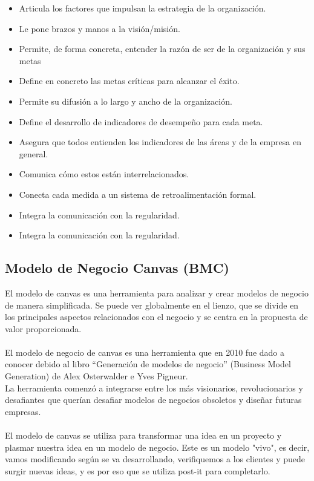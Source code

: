\documentclass[preprint,12pt]{elsarticle}
\begin{document}
	\begin{itemize}
	\item Articula los factores que impulsan la estrategia de la organización.
	\item Le pone brazos y manos a la visión/misión.

	\item Permite, de forma concreta, entender la razón de ser de la organización y sus metas
	\item Define en concreto las metas críticas para alcanzar el éxito.

	\item Permite su difusión a lo largo y ancho de la organización.
	\item Define el desarrollo de indicadores de desempeño para cada meta.

	\item Asegura que todos entienden los indicadores de las áreas y de la empresa en general.
	\item Comunica cómo estos están interrelacionados.

	\item Conecta cada medida a un sistema de retroalimentación formal.
	\item Integra la comunicación con la regularidad.

	\item Integra la comunicación con la regularidad.
	\end{itemize}


	\subsection{\textbf{Modelo de Negocio Canvas (BMC) }}

El modelo de canvas es una herramienta para analizar y crear modelos de negocio de manera simplificada. Se puede ver globalmente en el lienzo, que se divide en los principales aspectos relacionados con el negocio y se centra en la propuesta de valor proporcionada. \\\\
El modelo de negocio de canvas es una herramienta que en 2010 fue dado a conocer debido al libro “Generación de modelos de negocio” (Business Model Generation) de Alex Osterwalder e Yves Pigneur. \cite{referenciasosa4}\\
La herramienta comenzó a integrarse entre los más visionarios, revolucionarios y desafiantes que querían desafiar modelos de negocios obsoletos y diseñar futuras empresas.  \cite{referenciasosa4}\\\\
El modelo de canvas se utiliza para transformar una idea en un proyecto y plasmar nuestra idea en un modelo de negocio. Este es un modelo "vivo", es decir, vamos modificando según se va desarrollando, verifiquemos a los clientes y puede surgir nuevas ideas, y es por eso que se utiliza post-it para completarlo.
\end{document}
